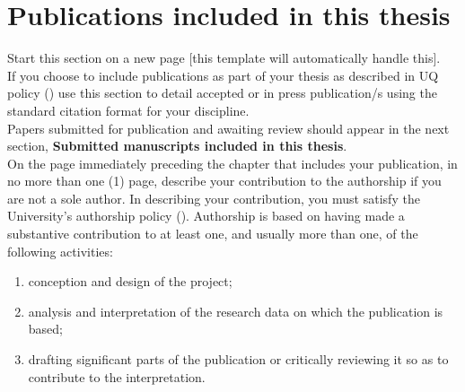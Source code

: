 


\section*{Publications included in this thesis}

\begin{instructional}

	Start this section on a new page [this template will automatically handle this].\\
	
	\noindent
	If you choose to include publications as part of your thesis as described in UQ policy (\href{http://ppl.app.uq.edu.au/content/4.60.07-alternate-thesis-format-options}{\color{blue}{PPL 4.60.07 Alternative Thesis Format Options}}) use this section to detail accepted or in press publication/s using the standard citation format for your discipline. \\
    
    \noindent
	Papers submitted for publication and awaiting review should appear in the next section, \textbf{Submitted manuscripts included in this thesis}.\\
    
    \noindent
	On the page immediately preceding the chapter that includes your publication, in no more than one (1) page, describe your contribution to the authorship if you are not a sole author. In describing your contribution, you must satisfy the University's authorship policy (\href{http://ppl.app.uq.edu.au/content/4.20.04-authorship}{\color{blue}{PPL 4.20.04 Authorship}}). Authorship is based on having made a substantive contribution to at least one, and usually more than one, of the following activities:
	\begin{enumerate}
		\item	conception and design of the project;
		\item	analysis and interpretation of the research data on which the publication is based;
		\item	drafting significant parts of the publication or critically reviewing it so as to contribute to the interpretation.
	\end{enumerate}
	

\end{instructional}
